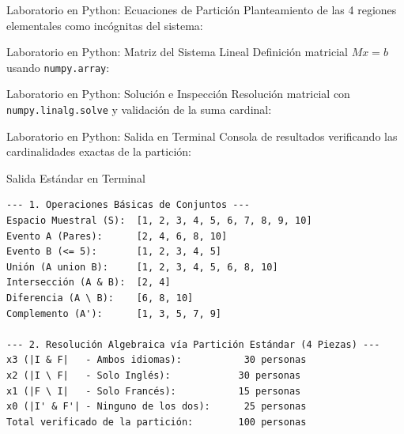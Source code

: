 \begin{frame}[fragile]{Laboratorio en Python: Ecuaciones de Partición}
  Planteamiento de las 4 regiones elementales como incógnitas del sistema:
  \vspace{0.1em}
  {
  }
\end{frame}

\begin{frame}[fragile]{Laboratorio en Python: Matriz del Sistema Lineal}
  Definición matricial $M x = b$ usando \texttt{numpy.array}:
  \vspace{0.1em}
  {
  }
\end{frame}

\begin{frame}[fragile]{Laboratorio en Python: Solución e Inspección}
  Resolución matricial con \texttt{numpy.linalg.solve} y validación de la suma cardinal:
  \vspace{0.1em}
  {
  }
\end{frame}

\begin{frame}[fragile]{Laboratorio en Python: Salida en Terminal}
  Consola de resultados verificando las cardinalidades exactas de la partición:
  \vspace{0.1em}
  \begin{block}{Salida Estándar en Terminal}
    \fontsize{6.5pt}{7.5pt}\selectfont
    \begin{verbatim}
--- 1. Operaciones Básicas de Conjuntos ---
Espacio Muestral (S):  [1, 2, 3, 4, 5, 6, 7, 8, 9, 10]
Evento A (Pares):      [2, 4, 6, 8, 10]
Evento B (<= 5):       [1, 2, 3, 4, 5]
Unión (A union B):     [1, 2, 3, 4, 5, 6, 8, 10]
Intersección (A & B):  [2, 4]
Diferencia (A \ B):    [6, 8, 10]
Complemento (A'):      [1, 3, 5, 7, 9]

--- 2. Resolución Algebraica vía Partición Estándar (4 Piezas) ---
x3 (|I & F|   - Ambos idiomas):           30 personas
x2 (|I \ F|   - Solo Inglés):            30 personas
x1 (|F \ I|   - Solo Francés):           15 personas
x0 (|I' & F'| - Ninguno de los dos):      25 personas
Total verificado de la partición:        100 personas
    \end{verbatim}
  \end{block}
\end{frame}

